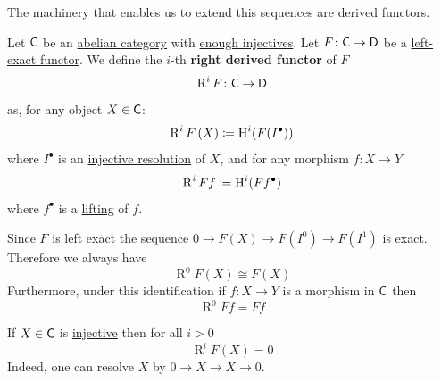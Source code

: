 \documentclass[../../main]{subfiles}
\begin{document}
The machinery that enables us to extend this sequences are derived functors.
\begin{definition}\label{def:right-derived-functor}
  Let \(\mathsf{C}\) be an \hyperref[def:abelian-category]{abelian category} with \hyperref[def:enough-injectives-projectives]{enough injectives}.
  Let \(F\colon \mathsf{C} \to \mathsf{D}\) be a \hyperref[def:exact-functor]{left-exact functor}.
  We define the \(i\)-th \textbf{right derived functor} of \(F\)
  \begin{equation*}
    \operatorname{R}^{i}F\colon \mathsf{C} \to \mathsf{D}
  \end{equation*}
  as, for any object \(X \in \mathsf{C}\):
  \begin{equation*}
    \operatorname{R}^{i}F\left(X\right) \coloneq \operatorname{H}^{i}(F(I^{\bullet}))
  \end{equation*}
  where \(I^{\bullet}\) is an \hyperref[def:resolution]{injective resolution} of \(X\), and for any morphism \(f\colon X \to Y\)
  \begin{align*}
    \operatorname{R}^{i}Ff \coloneq \operatorname{H}^{i}(F f^{\bullet})
  \end{align*}
  where \(f^{\bullet}\) is a \hyperref[thm:existence-of-lifting]{lifting} of \(f\).
\end{definition}

\begin{remark}
  Since \(F\) is \hyperref[def:exact-functor]{left exact} the sequence \(0 \to F(X) \to F(I^{0}) \to F(I^{1})\) is \hyperref[def:exact-sequence]{exact}.
  Therefore we always have
  \begin{equation*}
    \operatorname{R}^{0}F(X) \cong F(X)
  \end{equation*}
  Furthermore, under this identification if \(f\colon X \to Y\) is a morphism in \(\mathsf{C}\) then
  \begin{equation*}
    \operatorname{R}^{0}Ff = Ff
  \end{equation*}
\end{remark}

\begin{remark}
  If \(X \in \mathsf{C}\) is \hyperref[def:injective-projective-object]{injective} then for all \(i > 0\)
  \begin{equation*}
    \operatorname{R}^{i}F(X) = 0
  \end{equation*}
  Indeed, one can resolve \(X\) by \(0 \to X \to X \to 0\).
\end{remark}
\end{document}
